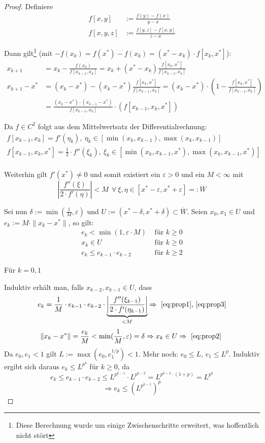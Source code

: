 \begin{proof}
Definiere
\begin{align*}
f[x,y]   &:= \frac{f(y)-f(x)}{y-x} \\
f[x,y,z] &:= \frac{f[y,z]-f[x,y]}{z-x}
\end{align*}

Dann gilt\footnote{Diese Berechnung wurde um einige Zwischenschritte erweitert,
was hoffentlich nicht stört} (mit $-f(x_k) = f(x^*)-f(x_k) = (x^*-x_k)\cdot f[x_k,x^*]$):
\begin{align*}
  x_{k+1}&=x_k-\frac{f(x_k)}{f[x_{k-1},x_k]} = x_k + (x^*-x_k)\frac{f[x_k,x^*]}{f[x_{k-1},x_k]}
\\x_{k+1}-x^*& = (x_k - x^*) - (x_k-x^*)\frac{f[x_k,x^*]}{f[x_{k-1},x_k]} =
(x_k-x^*)\cdot (1-\frac{f[x_k,x^*]}{f[x_{k-1},x_k]})
\\&=\frac{(x_k-x^*)\cdot(x_{k-1}-x^*)}{f[x_{k-1},x_k]}\cdot (f[x_{k-1},x_k,x^*])
\end{align*}

Da $f\in C^2$ folgt aus dem Mittelwertsatz der Differentialrechnung:
\begin{align*}
f[x_{k-1},x_k]     =f'(\eta_k), \ \eta_k\in [\min(x_k,x_{k-1}), \max(x_k,x_{k-1})] \\
f[x_{k-1},x_k,x^*] =\frac{1}{2}\cdot f''(\xi_k), \ \xi_k\in [\min(x_k,x_{k-1},x^*), \max(x_k,x_{k-1},x^*)]\\
\end{align*}

Weiterhin gilt $f'(x^*)\neq 0$ und somit existiert ein $\varepsilon > 0$ und ein $M<\infty$ mit
\[ %
  \left| \frac{f''(\xi)}{2\cdot f'(\eta)} \right|<M \ \ \forall \ \xi,\eta\in
[x^*-\varepsilon,x^*+\varepsilon]=:\overline{W}
\]

Sei nun $\delta:= \min (\frac{1}{M},\varepsilon)$ und
$U:=(x^*-\delta,x^*+\delta)\subset \overline{W}$.
Seien $x_0, x_1\in U$ und $e_k:=M\cdot \|x_k-x^*\|$, so gilt:
\begin{align}
e_k< \min(1,\varepsilon \cdot M)  & \mbox{ für } k\geq 0 \label{eq:prop1}\\ %
x_k\in U                          & \mbox{ für } k\geq 0 \label{eq:prop2}\\ %
e_k\leq e_{k-1}\cdot e_{k-2}      & \mbox{ für } k\geq 2 \label{eq:prop3}   %
\end{align}

Für $k=0,1$ \checkmark\newline

Induktiv erhält man, falls $x_{k-2},x_{k-1}\in U$, dass
\[
  e_k=\frac{1}{M}\cdot e_{k-1}\cdot e_{k-2}\cdot \underset{<M}{\underbrace{\left|\frac{f''(\xi_{k-1})}{2\cdot
  f'(\eta_{k-1})}\right|}} \Rightarrow \mbox{ \eqref{eq:prop1}, \eqref{eq:prop3}}
\]
\[
  \|x_k-x^*\|=\frac{e_k}{M}<\min(\frac{1}{M},\varepsilon)=\delta\Rightarrow
x_k\in U\Rightarrow \mbox{ \eqref{eq:prop2} }
\]
Da $e_0,e_1<1$ gilt $L:=\max(e_0,e_1^{1/p})<1$. Mehr noch: $e_0\leq L$,
$e_1\leq L^p$. Induktiv ergibt sich daraus $e_k\leq L^{p^k}$ für $k\geq 0$, %
da
\[
  e_k\leq e_{k-1}\cdot e_{k-2}\leq L^{p^{k-1}}\cdot L^{p^{k-2}}=L^{p^{k-2}\cdot
(1+p)} = L^{p^k}
\]\[
  \Rightarrow e_k\leq (L^{p^{k-1}})^p
\]
\end{proof}
